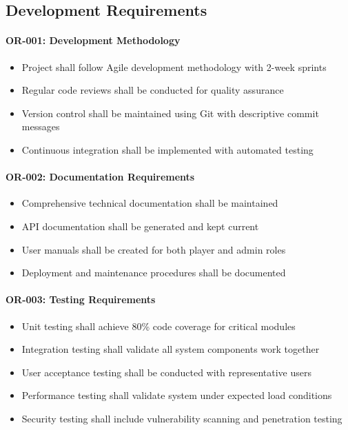 \documentclass[12pt,a4paper]{article}
\begin{document}
\begin{enumerate}
\subsection{Development Requirements}

\paragraph{OR-001: Development Methodology}
\begin{itemize}
    \item Project shall follow Agile development methodology with 2-week sprints
    \item Regular code reviews shall be conducted for quality assurance
    \item Version control shall be maintained using Git with descriptive commit messages
    \item Continuous integration shall be implemented with automated testing
\end{itemize}

\paragraph{OR-002: Documentation Requirements}
\begin{itemize}
    \item Comprehensive technical documentation shall be maintained
    \item API documentation shall be generated and kept current
    \item User manuals shall be created for both player and admin roles
    \item Deployment and maintenance procedures shall be documented
\end{itemize}

\paragraph{OR-003: Testing Requirements}
\begin{itemize}
    \item Unit testing shall achieve 80\% code coverage for critical modules
    \item Integration testing shall validate all system components work together
    \item User acceptance testing shall be conducted with representative users
    \item Performance testing shall validate system under expected load conditions
    \item Security testing shall include vulnerability scanning and penetration testing
\end{itemize}


\end{enumerate}
\end{document}
